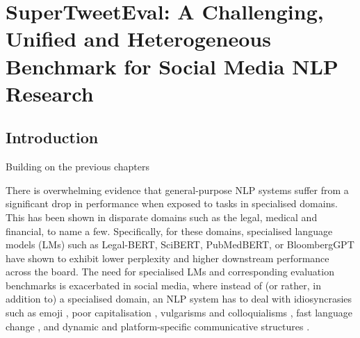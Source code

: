 \chapter{SuperTweetEval: A Challenging, Unified and Heterogeneous Benchmark for Social Media NLP Research}
\label{ch:super-tweeteval}


\section{Introduction}
Building on the previous chapters 

There is overwhelming evidence that general-purpose NLP systems suffer from a significant drop in performance when exposed to tasks in specialised domains. This has been shown in disparate domains such as the legal, medical and financial, to name a few. Specifically, for these domains, specialised language models (LMs) such as Legal-BERT, SciBERT, PubMedBERT, or BloombergGPT \cite{chalkidis2020legal,beltagy2019scibert,gu2021domain,wu2023bloomberggpt} have shown to exhibit lower perplexity and higher downstream performance across the board. The need for specialised LMs and corresponding evaluation benchmarks is exacerbated in social media, where instead of (or rather, in addition to) a specialised domain, an NLP system has to deal with idiosyncrasies such as emoji \cite{miller2017understanding,cappallo2018new,barbieri2017emojis}, poor capitalisation \cite{derczynski2015analysis}, vulgarisms and colloquialisms \cite{Camacho-Collados_Doval_Martínez-Cámara_Espinosa-Anke_Barbieri_Schockaert_2020}, fast language change \cite{del2019short,loureiro-etal-2022-timelms}, and dynamic and platform-specific communicative structures \cite{bastos2013gatekeeping}.

